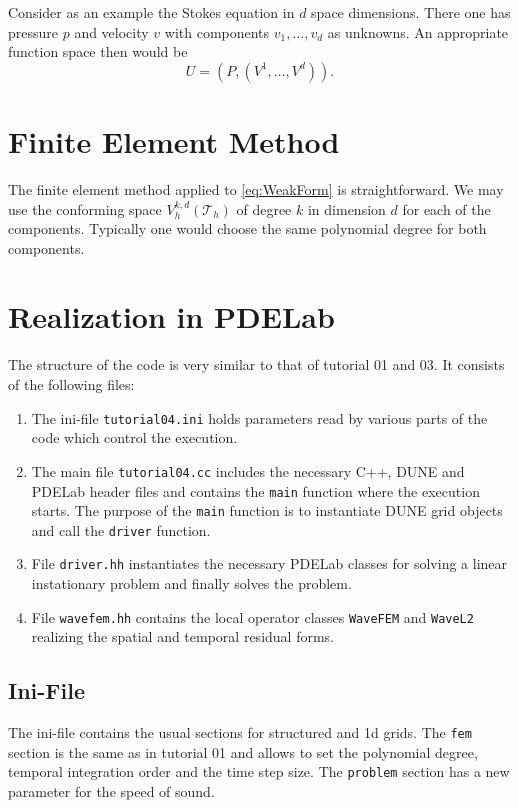 \documentclass[a4paper,12pt]{article}
\begin{document}
Consider as an example the Stokes equation in $d$ space dimensions.
There one has pressure $p$ and velocity $v$ with components $v_1,\ldots,v_d$
as unknowns. An appropriate function space then would be
$$ U = (P,(V^1,\ldots,V^d)).$$

\section{Finite Element Method}

The finite element method applied to \eqref{eq:WeakForm} is straightforward.
We may use the conforming space $V_h^{k,d}(\mathcal{T}_h)$ of degree $k$
in dimension $d$ for each of the components. Typically one would choose
the same polynomial degree for both components.

\section{Realization in PDELab}

The structure of the code is very similar to that of tutorial 01 and 03.
It consists of the following files:
\begin{enumerate}[1)]
\item The ini-file
\lstinline{tutorial04.ini} holds parameters read by various parts of the code
which control the execution.
\item The main file \lstinline{tutorial04.cc} includes the necessary C++,
DUNE and PDELab header files
and contains the \lstinline{main} function where the execution starts.
The purpose of the \lstinline{main} function is
to instantiate DUNE grid objects and call the \lstinline{driver} function.
\item File \lstinline{driver.hh} instantiates the necessary PDELab classes 
for solving a linear instationary problem and finally solves the problem.
\item File \lstinline{wavefem.hh} contains the local operator classes
\lstinline{WaveFEM} and \lstinline{WaveL2} realizing the spatial
and temporal residual forms.
\end{enumerate}

\subsection{Ini-File}

The ini-file contains the usual sections for structured and 1d grids. The
\lstinline{fem} section is the same as in tutorial 01 and allows to set
the polynomial degree, temporal integration order and the time step size.
The \lstinline{problem} section has a new parameter for the speed of sound.

\end{document}
